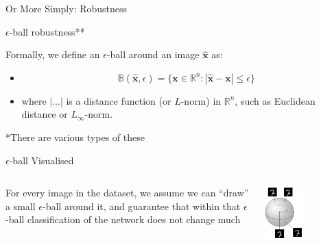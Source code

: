 \documentclass[t,compress,aspectratio=169]{beamer}
\begin{document}
\begin{frame}{Or More Simply: Robustness}

\begin{alertblock}{$\epsilon$-ball robustness**}

Formally, we define an $\epsilon$-ball around an image $\hat{\mathbf{x}}$ as:


\begin{itemize}
    \item[] $$\mathbb{B}(\hat{\mathbf{x}}, \epsilon) = \{ \mathbf{x} \in \mathbb{R}^n: |\hat{\mathbf{x}}-\mathbf{x}| \leq \epsilon \}$$
    \item [] where $| ... |$ is a distance function (or $L$-norm) in $\mathbb{R}^n$,
such as Euclidean distance or $L_{\infty}$-norm.
\end{itemize}
\end{alertblock}
 \vfill
 \footnotesize **There are various types of these
\end{frame}

\begin{frame}{$\epsilon$-ball Visualised}

 \begin{columns}
        \begin{column}{0.35\textwidth}
        \begin{center}
                For every image in the dataset, we assume we can “draw” a small $\epsilon$-ball around it, and guarantee that within that $\epsilon$-ball classification of the network does not change much
        \end{center}

        \end{column}
        \begin{column}{0.6\textwidth}
             \begin{center}
             \vspace{-1em}
    \centering\includegraphics[width=0.45\textwidth]{img/epsballmnist.png}

             \end{center}
        \end{column}
\end{columns}



\end{frame}
\end{document}
